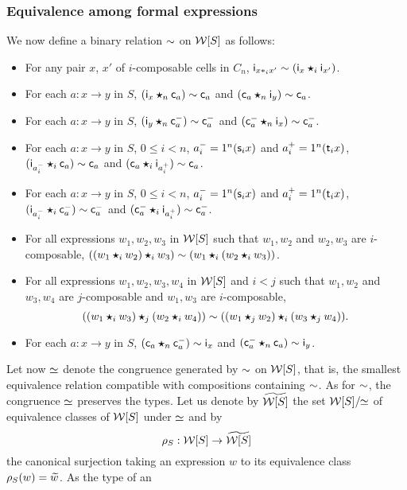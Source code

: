  \subsubsection{Equivalence among formal
   expressions}\label{ssubsec:eqform}
We now define a
binary relation $\sim$ on $\mathcal{W}[S]$ as follows:
\begin{itemize}
\item For any pair $x$, $x'$ of $i$-composable cells in $C_n$,
  $\mathsf{i}_{x\ast_{i} x'}\sim (\mathsf{i}_{x}\bm{\star}_{i}\mathsf{i}_{x'})$.
\item For each $a:x\to y$ in $S$, $(\mathsf{i}_{x}\bm{\star}_{n}\mathsf{c}_{a})\sim
  \mathsf{c}_{a}$ and $(\mathsf{c}_{a}\bm{\star}_{n} \mathsf{i}_{y})\sim \mathsf{c}_{a}$.
 \item For each $a:x\to y$ in $S$, $(\mathsf{i}_{y}\bm{\star}_{n}\mathsf{c}^{-}_{a})\sim
   \mathsf{c}^{-}_{a}$ and $(\mathsf{c}^{-}_{a}\bm{\star}_{n} \mathsf{i}_{x})\sim \mathsf{c}^{-}_{a}$.
\item For each $a:x\to y$ in $S$, $0\leq i< n$, $a_i^{-}=1^{n}(\mathsf{s}_{i}
  x)$ and $a_i^{+}=1^{n}(\mathsf{t}_{i} x)$, $(\mathsf{i}_{a_i^{-}}\bm{\star}_{i}\mathsf{c}_{a})\sim
  \mathsf{c}_{a}$ and $(\mathsf{c}_{a}\bm{\star}_{i} \mathsf{i}_{a_i^+})\sim \mathsf{c}_{a}$.
\item For each $a:x\to y$ in $S$, $0\leq i< n$, $a_i^{-}=1^{n}(\mathsf{s}_{i}
  x)$ and $a_i^{+}=1^{n}(\mathsf{t}_{i} x)$, $(\mathsf{i}_{a_i^{-}}\bm{\star}_{i}\mathsf{c}^{-}_{a})\sim
  \mathsf{c}^{-}_{a}$ and $(\mathsf{c}^{-}_{a}\bm{\star}_{i} \mathsf{i}_{a_i^+})\sim \mathsf{c}^{-}_{a}$.  
 \item For all expressions $w_1,w_2,w_3$ in $\mathcal{W}[S]$ such that $w_1,w_2$ and
   $w_2,w_3$ are $i$-composable, $((w_1\bm{\star}_{i} w_2)\bm{\star}_{i} w_3)\sim
   (w_1\bm{\star}_{i}(w_2\bm{\star}_{i} w_3))$.
 \item For all expressions $w_1,w_2,w_3,w_4$ in $\mathcal{W}[S]$ and $i<j$
   such that $w_1,w_2$ and $w_3,w_4$ are
   $j$-composable and $w_1,w_3$ are $i$-composable,
   \[
     ((w_1\bm{\star}_{i} w_3)\bm{\star}_{j} (w_2\bm{\star}_{i} w_4))\sim ((w_1\bm{\star}_{j}
     w_2)\bm{\star}_{i} (w_3\bm{\star}_{j} w_4)).
   \]
  \item For each $a:x\to y$ in $S$, $(\mathsf{c}_{a}\bm{\star}_{n}\mathsf{c}^{-}_{a})\sim
    \mathsf{i}_{x}$ and $(\mathsf{c}^{-}_{a}\bm{\star}_{n}\mathsf{c}_{a})\sim \mathsf{i}_{y}$. 
  \end{itemize}
  Let now $\simeq$ denote the congruence generated by
  $\sim$ on $\mathcal{W}[S]$, that is, the smallest equivalence relation
  compatible with compositions containing $\sim$. As for $\sim$, the
  congruence $\simeq$ preserves the types. Let us denote by $\widetilde{\mathcal{W}[S]}$
  the set $\mathcal{W}[S]/\!\!\simeq$ of equivalence classes of $\mathcal{W}[S]$ under
  $\simeq$ and by
  \[\rho_{S}: \mathcal{W}[S]\to \widetilde{\mathcal{W}[S]}\]
  the canonical surjection taking an expression $w$ to its
  equivalence class $\rho_{S}(w)=\widetilde{w}$. As the type of an
